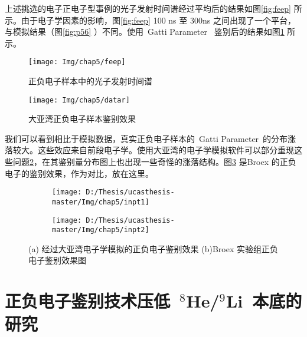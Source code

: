 上述挑选的电子正电子型事例的光子发射时间谱经过平均后的结果如图\ref{fig:feep} 所示。由于电子学因素的影响，图\ref{fig:feep} 100 ns 至 300ns 之间出现了一个平台，与模拟结果（图\ref{fig:p56} ）不同。使用~Gatti Parameter~ 鉴别后的结果如图\ref{fig:datar} 所示。
\begin{figure}[!htbp]
\begin{minipage}[t]{0.48\linewidth}
    \centering
    \texttt{[image: Img/chap5/feep]}
    \caption{正负电子样本中的光子发射时间谱}
    \label{fig:feep}
\end{minipage}
\quad\quad
\begin{minipage}[t]{0.48\linewidth}
    \centering
    \texttt{[image: Img/chap5/datar]}
    \caption{大亚湾正负电子样本鉴别效果}
    \label{fig:datar}
\end{minipage}
\end{figure}
我们可以看到相比于模拟数据，真实正负电子样本的~Gatti Parameter~的分布涨落较大。这些效应来自前段电子学。使用大亚湾的电子学模拟软件可以部分重现这些问题\ref{fig:inpt_1}，在其鉴别量分布图上也出现一些奇怪的涨落结构。图\ref{fig:inpt_2} 是Broex 的正负电子的鉴别效果，作为对比，放在这里。
\begin{figure}[!htbp]
  \centering
  \begin{subfigure}[b]{\MySubFactor\textwidth}
    \texttt{[image: D:/Thesis/ucasthesis-master/Img/chap5/inpt1]}
    \caption{}
    \label{fig:inpt_1}
  \end{subfigure}%
  \quad\quad\quad\quad\quad\quad%
  \begin{subfigure}[b]{\MySubFactor\textwidth}
    \texttt{[image: D:/Thesis/ucasthesis-master/Img/chap5/inpt2]}
    \caption{}
    \label{fig:inpt_2}
  \end{subfigure}
  \caption{(a) 经过大亚湾电子学模拟的正负电子鉴别效果 (b)Broex 实验组正负电子鉴别效果图}
  \label{fig:inpt}
\end{figure}
\section{正负电子鉴别技术压低~$^{8}$He/$^{9}$Li~本底的研究}
